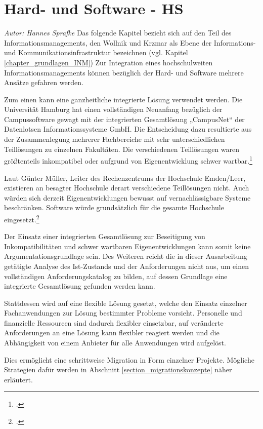 \section{Hard- und Software - HS}
\textit{Autor: Hannes Sprafke}
Das folgende Kapitel bezieht sich auf den Teil des Informationsmanagements, den 
Wollnik und Krzmar als Ebene der Informations- und Kommunikationsinfrastruktur 
bezeichnen (vgl. Kapitel \ref{chapter_grundlagen_INM}) Zur Integration eines hochschulweiten 
Informationsmanagements können bezüglich der Hard- und Software mehrere Ansätze 
gefahren werden.

Zum einen kann eine ganzheitliche integrierte Lösung verwendet werden. Die Universität 
Hamburg hat einen vollständigen Neuanfang bezüglich der Campussoftware gewagt mit 
der integrierten Gesamtlösung „CampusNet“ der Datenlotsen Informationssysteme GmbH. 
Die Entscheidung dazu resultierte aus der Zusammenlegung mehrerer Fachbereiche mit 
sehr unterschiedlichen Teillösungen zu einzelnen Fakultäten. Die verschiedenen Teillösungen 
waren größtenteils inkompatibel oder aufgrund von Eigenentwicklung schwer 
wartbar.\footcite[Vgl.][38]{dini_webportale_2007}

Laut Günter Müller, Leiter des Rechenzentrums der Hochschule Emden/Leer, existieren 
an besagter Hochschule derart verschiedene Teillösungen nicht. Auch würden sich derzeit
Eigenentwicklungen bewusst auf vernachlässigbare Systeme beschränken. 
Software würde grundsätzlich für die gesamte Hochschule 
eingesetzt.\footcite{gunter_muller_interview}

Der Einsatz einer integrierten Gesamtlösung zur Beseitigung von Inkompatibilitäten und 
schwer wartbaren Eigenentwicklungen kann somit keine Argumentationsgrundlage sein.
Des Weiteren reicht die in dieser Ausarbeitung getätigte Analyse des Ist-Zustands und 
der Anforderungen nicht aus, um einen vollständigen Anforderungskatalog zu bilden, 
auf dessen Grundlage eine integrierte Gesamtlösung gefunden werden kann.

Stattdessen wird auf eine flexible Lösung gesetzt, welche den Einsatz einzelner 
Fachanwendungen zur Lösung bestimmter Probleme vorsieht. Personelle und 
finanzielle Ressourcen sind dadurch flexibler einsetzbar, auf veränderte Anforderungen 
an eine Lösung kann flexibler reagiert werden und die Abhängigkeit von einem 
Anbieter für alle Anwendungen wird aufgelöst.

Dies ermöglicht eine schrittweise Migration in Form einzelner Projekte. 
Mögliche Strategien dafür werden in Abschnitt \ref{section_migrationskonzepte} näher erläutert. 

